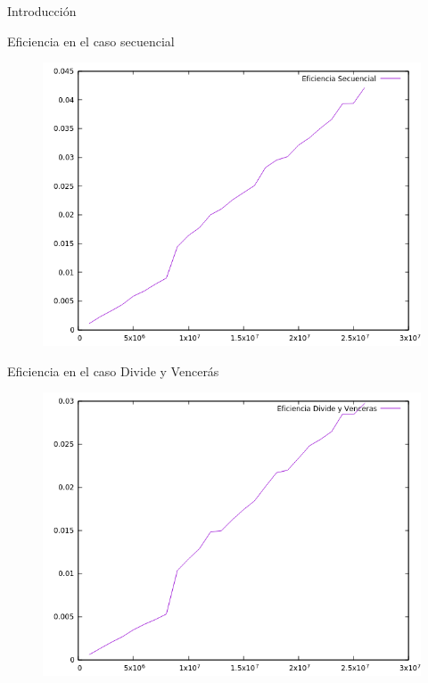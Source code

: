\documentclass[12pt]{beamer}
\begin{document}
\begin{frame}{Introducción}
\begin{frame}
\end{frame}

\begin{frame}{Eficiencia en el caso secuencial}

\begin{figure}[H] 
\centering
\includegraphics[angle=0,scale=0.5]{img/Eficiencia_sec.png} 
\end{figure}

\end{frame}

\begin{frame}{Eficiencia en el caso Divide y Vencerás}

\begin{figure}[H] 
\centering
\includegraphics[angle=0,scale=0.5]{img/Eficiencia_dyv.png} 
\end{figure}


\end{frame}
\end{frame}
\end{document}
